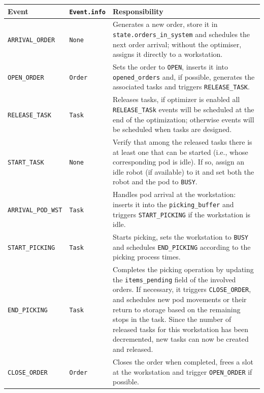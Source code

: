 \documentclass[a4paper,10pt]{article}
\begin{document}
\begin{table}[htbp]
\begin{tabularx}{\textwidth}{p{3cm} p{4cm} X}
\toprule
\textbf{Event} & \textbf{\texttt{Event.info}} & \textbf{Responsibility} \\
\midrule
\texttt{ARRIVAL\_ORDER}    
& \texttt{None} 
& Generates a new order, store it in \texttt{state.orders\_in\_system} and schedules the next order arrival; without the optimiser, assigns it directly to a workstation. \\

\texttt{OPEN\_ORDER}       
& \texttt{Order} 
& Sets the order to \texttt{OPEN}, inserts it into \texttt{opened\_orders} and, if possible, generates the associated tasks and triggers \texttt{RELEASE\_TASK}. \\

\texttt{RELEASE\_TASK}     
& \texttt{Task}
& Releases tasks, if optimizer is enabled all \texttt{RELEASE\_TASk} events will be scheduled at the end of the optimization; otherwise events will be scheduled when tasks are designed. \\

\texttt{START\_TASK}       
& \texttt{None} 
& Verify that among the released tasks there is at least one that can be started (i.e., whose corresponding pod is idle). If so, assign an idle robot (if available) to it and set both the robot and the pod to \texttt{BUSY}. \\

\texttt{ARRIVAL\_POD\_WST} 
& \texttt{Task} 
& Handles pod arrival at the workstation: inserts it into the \texttt{picking\_buffer} and triggers \texttt{START\_PICKING} if the workstation is idle. \\

\texttt{START\_PICKING}    
& \texttt{Task} 
& Starts picking, sets the workstation to \texttt{BUSY} and schedules \texttt{END\_PICKING} according to the picking process times. \\

\texttt{END\_PICKING}      
& \texttt{Task} 
& Completes the picking operation by updating the \texttt{items\_pending} field of the involved orders. If necessary, it triggers \texttt{CLOSE\_ORDER}, and schedules new pod movements or their return to storage based on the remaining stops in the task. Since the number of released tasks for this workstation has been decremented, new tasks can now be created and released.\\

\texttt{CLOSE\_ORDER}      
& \texttt{Order} 
& Closes the order when completed, frees a slot at the workstation and trigger \texttt{OPEN\_ORDER} if possible. \\


\end{tabularx}
\end{table}
\end{document}
